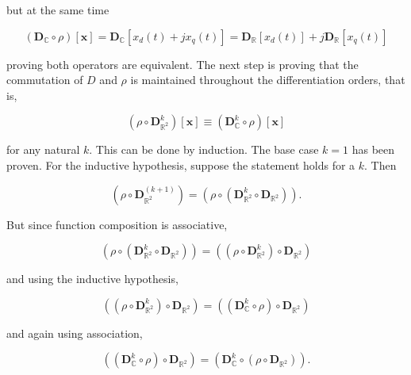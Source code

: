 	\noindent but at the same time

\begin{equation} \left( \mathbf{D}_{\mathbb{C}}\circ\rho\right)\left[\mathbf{x}\right] = \mathbf{D}_{\mathbb{C}}\left[x_d(t) + jx_q(t)\right]  = \mathbf{D}_{\mathbb{R}}\left[x_d(t)\right] + j\mathbf{D}_{\mathbb{R}}\left[x_q(t)\right] \end{equation}

	\noindent proving both operators are equivalent. The next step is proving that the commutation of $D$ and $\rho$ is maintained throughout the differentiation orders, that is,

\begin{equation} \left(\rho\circ \mathbf{D}^k_{\mathbb{R}^2}\right)\left[\mathbf{x}\right]\equiv \left(\mathbf{D}^k_{\mathbb{C}}\circ \rho\right)\left[\mathbf{x}\right]\end{equation}

	\noindent for any natural $k$. This can be done by induction. The base case $k=1$ has been proven. For the inductive hypothesis, suppose the statement holds for a $k$. Then

\begin{equation} \left(\rho\circ \mathbf{D}^{\left(k+1\right)}_{\mathbb{R}^2}\right) = \left(\rho\circ \left(\mathbf{D}^k_{\mathbb{R}^2}\circ \mathbf{D}_{\mathbb{R}^2}\right)\right)  .\end{equation} 

	But since function composition is associative,

\begin{equation} \left(\rho\circ \left(\mathbf{D}^k_{\mathbb{R}^2}\circ \mathbf{D}_{\mathbb{R}^2}\right)\right) = \left(\left(\rho\circ \mathbf{D}^k_{\mathbb{R}^2}\right)\circ \mathbf{D}_{\mathbb{R}^2}\right)  \end{equation}

	\noindent and using the inductive hypothesis,

\begin{equation} \left(\left(\rho\circ \mathbf{D}^k_{\mathbb{R}^2}\right)\circ \mathbf{D}_{\mathbb{R}^2}\right) = \left(\left( \mathbf{D}^k_\mathbb{C}\circ\rho\right)\circ \mathbf{D}_{\mathbb{R}^2}\right) \end{equation}

	\noindent and again using association,

\begin{equation} \left(\left( \mathbf{D}^k_\mathbb{C}\circ\rho\right)\circ \mathbf{D}_{\mathbb{R}^2}\right) = \left( \mathbf{D}^k_\mathbb{C}\circ \left(\rho\circ \mathbf{D}_{\mathbb{R}^2}\right)\right) .\end{equation}

